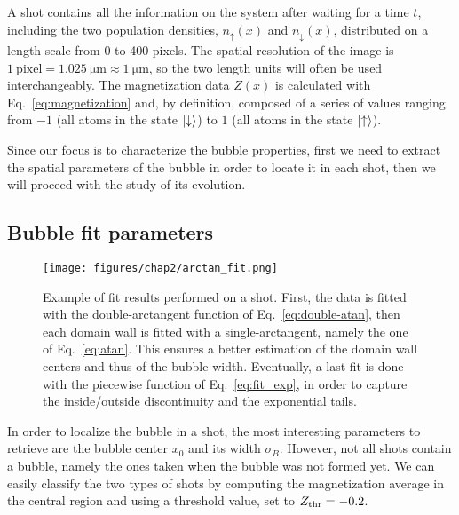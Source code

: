 A shot contains all the information on the system after waiting for a time $t$, including the two population densities, $n_\uparrow(x)$ and $n_\downarrow(x)$, distributed on a length scale from 0 to 400 pixels. The spatial resolution of the image is $1\ \text{pixel} = 1.025\ \unit{\micro\meter} \approx 1\ \unit{\micro\meter}$, so the two length units will often be used interchangeably. The magnetization data $Z(x)$ is calculated with Eq.\ \eqref{eq:magnetization} and, by definition, composed of a series of values ranging from $-1$ (all atoms in the state $\ket{\downarrow}$) to $1$ (all atoms in the state $\ket{\uparrow}$).

Since our focus is to characterize the bubble properties, first we need to extract the spatial parameters of the bubble in order to locate it in each shot, then we will proceed with the study of its evolution.

\subsection{Bubble fit parameters}
\begin{figure}[ht!]
    \centering
    \texttt{[image: figures/chap2/arctan\_fit.png]}
    \caption{Example of fit results performed on a shot. First, the data is fitted with the double-arctangent function of Eq.\ \eqref{eq:double-atan}, then each domain wall is fitted with a single-arctangent, namely the one of Eq.\ \eqref{eq:atan}. This ensures a better estimation of the domain wall centers and thus of the bubble width. Eventually, a last fit is done with the piecewise function of Eq.\ \eqref{eq:fit_exp}, in order to capture the inside/outside discontinuity and the exponential tails.}
    \label{fig:atan-fit}
\end{figure}
In order to localize the bubble in a shot, the most interesting parameters to retrieve are the bubble center $x_0$ and its width $\sigma_B$.
However, not all shots contain a bubble, namely the ones taken when the bubble was not formed yet. We can easily classify the two types of shots by computing the magnetization average in the central region and using a threshold value, set to $Z_{\rm thr} = -0.2$. 

